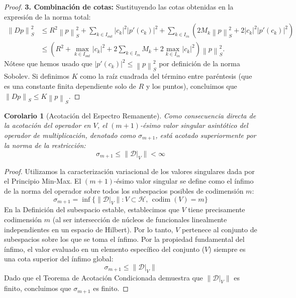 \documentclass[12pt,a4paper]{article}
\newtheorem{corolario}{Corolario}
\theoremstyle{definition}
\theoremstyle{remark}
\newcommand{\norm}[1]{\left\| #1 \right\|_S}
\newcommand{\abs}[1]{\left| #1 \right|}
\newcommand{\D}{\mathcal{D}}
\begin{document}
\begin{proof}
    \textbf{3. Combinación de cotas:}
    Sustituyendo las cotas obtenidas en la expresión de la norma total:
    \begin{align*}
        \norm{Dp}^2 & \leq R^2 \norm{p}^2 + \sum_{k \in I_{out}} \abs{c_k}^2 \abs{p'(c_k)}^2 + \sum_{k \in I_{in}} \left( 2 M_k \norm{p}^2 + 2 \abs{c_k}^2 \abs{p'(c_k)}^2 \right) \\
                    & \leq \left( R^2 + \max_{k \in I_{out}}\abs{c_k}^2 + 2\sum_{k \in I_{in}} M_k + 2\max_{k \in I_{in}}\abs{c_k}^2 \right) \norm{p}^2.
    \end{align*}
    Nótese que hemos usado que $\abs{p'(c_k)}^2 \leq \norm{p}^2$ por definición de la norma Sobolev. Si definimos $K$ como la raíz cuadrada del término entre paréntesis (que es una constante finita dependiente solo de $R$ y los puntos), concluimos que $\norm{Dp} \leq K \norm{p}$.
\end{proof}

\begin{corolario}[Acotación del Espectro Remanente]
    Como consecuencia directa de la acotación del operador en $V$, el $(m+1)$-ésimo valor singular asintótico del operador de multiplicación, denotado como $\sigma_{m+1}$, está acotado superiormente por la norma de la restricción:
    \begin{equation}
        \sigma_{m+1} \le \|\D|_V\| < \infty
    \end{equation}
\end{corolario}

\begin{proof}
    Utilizamos la caracterización variacional de los valores singulares dada por el Principio Min-Max. El $(m+1)$-ésimo valor singular se define como el ínfimo de la norma del operador sobre todos los subespacios posibles de codimensión $m$:
    $$ \sigma_{m+1} = \inf \{ \|\D|_V\| : V \subset \mathcal{H}, \, \operatorname{codim}(V) = m \} $$
    En la Definición del subespacio estable, establecimos que $V$ tiene precisamente codimensión $m$ (al ser intersección de núcleos de funcionales linealmente independientes en un espacio de Hilbert). Por lo tanto, $V$ pertenece al conjunto de subespacios sobre los que se toma el ínfimo.
    Por la propiedad fundamental del ínfimo, el valor evaluado en un elemento específico del conjunto ($V$) siempre es una cota superior del ínfimo global:
    $$ \sigma_{m+1} \le \|\D|_V\| $$
    Dado que el Teorema de Acotación Condicionada demuestra que $\|\D|_V\|$ es finito, concluimos que $\sigma_{m+1}$ es finito.
\end{proof}
\end{document}
